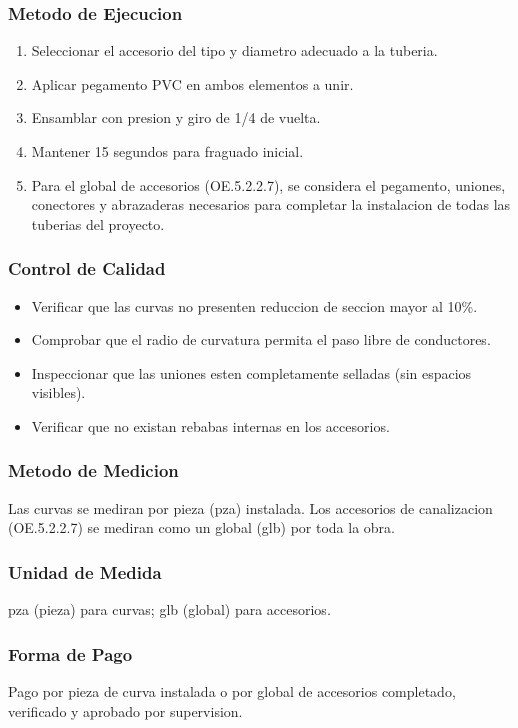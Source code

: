 \subsubsection{Metodo de Ejecucion}

\begin{enumerate}
  \item Seleccionar el accesorio del tipo y diametro adecuado a la tuberia.
  \item Aplicar pegamento PVC en ambos elementos a unir.
  \item Ensamblar con presion y giro de 1/4 de vuelta.
  \item Mantener 15 segundos para fraguado inicial.
  \item Para el global de accesorios (OE.5.2.2.7), se considera el pegamento, uniones, conectores y abrazaderas necesarios para completar la instalacion de todas las tuberias del proyecto.
\end{enumerate}

\subsubsection{Control de Calidad}

\begin{itemize}
  \item Verificar que las curvas no presenten reduccion de seccion mayor al 10\%.
  \item Comprobar que el radio de curvatura permita el paso libre de conductores.
  \item Inspeccionar que las uniones esten completamente selladas (sin espacios visibles).
  \item Verificar que no existan rebabas internas en los accesorios.
\end{itemize}

\subsubsection{Metodo de Medicion}

Las curvas se mediran por pieza (pza) instalada. Los accesorios de canalizacion (OE.5.2.2.7) se mediran como un global (glb) por toda la obra.

\subsubsection{Unidad de Medida}

pza (pieza) para curvas; glb (global) para accesorios.

\subsubsection{Forma de Pago}

Pago por pieza de curva instalada o por global de accesorios completado, verificado y aprobado por supervision.
